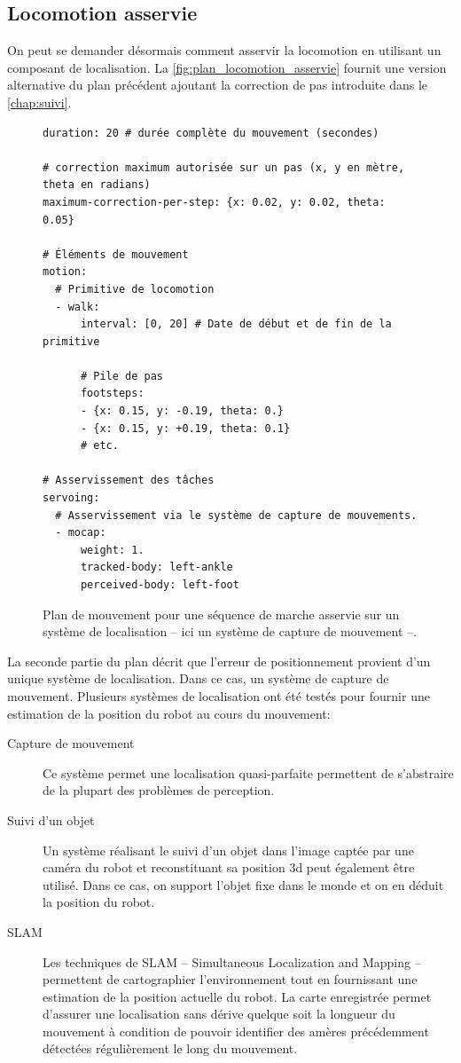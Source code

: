 \FloatBarrier

\subsection{Locomotion asservie}

On peut se demander désormais comment asservir la locomotion en
utilisant un composant de localisation. La
\autoref{fig:plan_locomotion_asservie} fournit une version alternative
du plan précédent ajoutant la correction de pas introduite dans le
\autoref{chap:suivi}.

\begin{figure}
  \begin{center}
\begin{verbatim}
duration: 20 # durée complète du mouvement (secondes)

# correction maximum autorisée sur un pas (x, y en mètre, theta en radians)
maximum-correction-per-step: {x: 0.02, y: 0.02, theta: 0.05}

# Éléments de mouvement
motion:
  # Primitive de locomotion
  - walk:
      interval: [0, 20] # Date de début et de fin de la primitive

      # Pile de pas
      footsteps:
      - {x: 0.15, y: -0.19, theta: 0.}
      - {x: 0.15, y: +0.19, theta: 0.1}
      # etc.

# Asservissement des tâches
servoing:
  # Asservissement via le système de capture de mouvements.
  - mocap:
      weight: 1.
      tracked-body: left-ankle
      perceived-body: left-foot
\end{verbatim}
  \end{center}
  \caption{Plan de mouvement pour une séquence de marche asservie sur
    un système de localisation -- ici un système de capture de
    mouvement --.\label{fig:plan_locomotion_asservie}}
\end{figure}

La seconde partie du plan décrit que l'erreur de positionnement
provient d'un unique système de localisation. Dans ce cas, un système
de capture de mouvement. Plusieurs systèmes de localisation ont été
testés pour fournir une estimation de la position du robot au cours du
mouvement:

\begin{description}
\item[Capture de mouvement] Ce système permet une localisation
  quasi-parfaite permettent de s'abstraire de la plupart des problèmes
  de perception.
\item[Suivi d'un objet] Un système réalisant le suivi d'un objet dans
  l'image captée par une caméra du robot et reconstituant sa position
  3d peut également être utilisé. Dans ce cas, on support l'objet fixe
  dans le monde et on en déduit la position du robot.
\item[SLAM] Les techniques de SLAM -- Simultaneous Localization and
  Mapping -- permettent de cartographier l'environnement tout en
  fournissant une estimation de la position actuelle du robot. La
  carte enregistrée permet d'assurer une localisation sans dérive
  quelque soit la longueur du mouvement à condition de pouvoir
  identifier des amères précédemment détectées régulièrement le long
  du mouvement.
\end{description}

